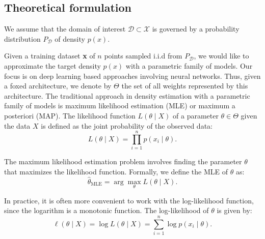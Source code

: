 \subsection{Theoretical formulation}
\begin{assumption}\label{ass:1}
    We assume that the domain of interest $\mathcal{D} \subset \mathcal{X}$ is governed by a probability distribution  $P_{\mathcal{D}}$ of density $p(x)$.
\end{assumption}
Given a training dataset \textbf{x} of $n$ points sampled i.i.d from $P_{\mathcal{D}}$, we would like to approximate the target density $p(x)$ with a parametric family of models. Our focus is on deep learning based approaches involving neural networks. Thus, given a foxed architecture, we denote by $\Theta$ the set of all weights represented by this architecture.
The traditional approach in density estimation with a parametric family of models is maximum likelihood estimation (MLE) or maximum a posteriori (MAP). The likelihood function $L(\theta \mid X)$ of a parameter $\theta \in \Theta$ given the data $X$ is defined as the joint probability of the observed data:
\begin{equation}
L(\theta \mid X) = \prod_{i=1}^n p(x_i \mid \theta).
\end{equation}

The maximum likelihood estimation problem involves finding the parameter $\theta$ that maximizes the likelihood function. Formally, we define the MLE of $\theta$ as:
\begin{equation}
\hat{\theta}_{\text{MLE}} = \arg\max_{\theta} L(\theta \mid X).
\end{equation}

In practice, it is often more convenient to work with the log-likelihood function, since the logarithm is a monotonic function. The log-likelihood of $\theta$ is given by:
\begin{equation}
\ell(\theta \mid X) = \log L(\theta \mid X) = \sum_{i=1}^n \log p(x_i \mid \theta).
\end{equation}

